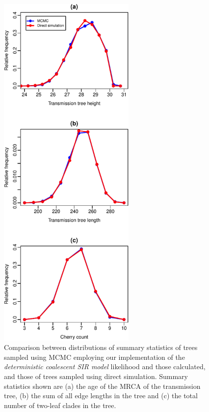 \documentclass[10pt]{article}
\begin{document}
\begin{figure}
  \vspace{-3cm}

    \begin{center}
      \includegraphics[width=0.6\textwidth]{detCoalFigure-crop.pdf}
    \end{center}
    \caption{Comparison between distributions of summary statistics of
      trees sampled using MCMC employing our implementation of the
      \emph{deterministic coalescent SIR model} likelihood and those
      calculated, and those of trees sampled using direct
      simulation. Summary statistics shown are (a) the age of the MRCA
      of the transmission tree, (b) the sum of all edge lengths in the
      tree and (c) the total number of two-leaf clades in the tree.}
    \label{fig:detCoalValidation}
\end{figure}
\end{document}
